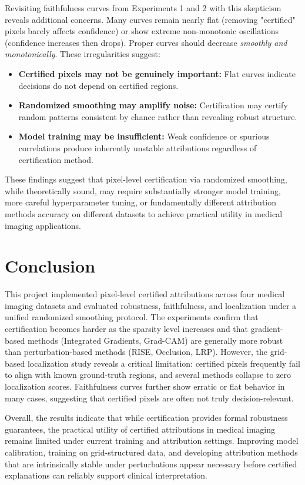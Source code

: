 \documentclass[11pt]{article}
\begin{document}
Revisiting faithfulness curves from Experiments 1 and 2 with this skepticism reveals additional concerns. Many curves remain nearly flat (removing "certified" pixels barely affects confidence) or show extreme non-monotonic oscillations (confidence increases then drops). Proper curves should decrease \emph{smoothly and monotonically}. These irregularities suggest:

\begin{itemize}
\item \textbf{Certified pixels may not be genuinely important:} Flat curves indicate decisions do not depend on certified regions.
\item \textbf{Randomized smoothing may amplify noise:} Certification may certify random patterns consistent by chance rather than revealing robust structure.
\item \textbf{Model training may be insufficient:} Weak confidence or spurious correlations produce inherently unstable attributions regardless of certification method.
\end{itemize}

These findings suggest that pixel-level certification via randomized smoothing, while theoretically sound, may require substantially stronger model training, more careful hyperparameter tuning, or fundamentally different attribution methods accuracy on different datasets to achieve practical utility in medical imaging applications.


\section{Conclusion}
This project implemented pixel-level certified attributions across four medical imaging datasets and evaluated robustness, faithfulness, and localization under a unified randomized smoothing protocol. The experiments confirm that certification becomes harder as the sparsity level increases and that gradient-based methods (Integrated Gradients, Grad-CAM) are generally more robust than perturbation-based methods (RISE, Occlusion, LRP). However, the grid-based localization study reveals a critical limitation: certified pixels frequently fail to align with known ground-truth regions, and several methods collapse to zero localization scores. Faithfulness curves further show erratic or flat behavior in many cases, suggesting that certified pixels are often not truly decision-relevant.

Overall, the results indicate that while certification provides formal robustness guarantees, the practical utility of certified attributions in medical imaging remains limited under current training and attribution settings. Improving model calibration, training on grid-structured data, and developing attribution methods that are intrinsically stable under perturbations appear necessary before certified explanations can reliably support clinical interpretation.


\end{document}
